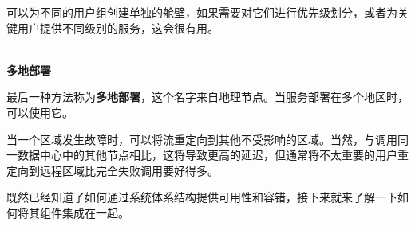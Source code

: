 可以为不同的用户组创建单独的舱壁，如果需要对它们进行优先级划分，或者为关键用户提供不同级别的服务，这会很有用。

\hspace*{\fill} \\ %
\noindent
\textbf{多地部署}

最后一种方法称为\textbf{多地部署}，这个名字来自地理节点。当服务部署在多个地区时，可以使用它。

当一个区域发生故障时，可以将流重定向到其他不受影响的区域。当然，与调用同一数据中心中的其他节点相比，这将导致更高的延迟，但通常将不太重要的用户重定向到远程区域比完全失败调用要好得多。

既然已经知道了如何通过系统体系结构提供可用性和容错，接下来就来了解一下如何将其组件集成在一起。





















